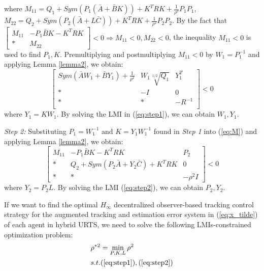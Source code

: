 \documentclass[journal,12pt,onecolumn,draftclsnofoot,]{IEEEtran}
\begin{document}
where $M_{11}=Q_1+Sym(P_1(\bar{A}+\bar{B}K)) + K^TRK + \frac{1}{\rho^2}P_1P_1$, $M_{22}=Q_2+Sym(P_2(\bar{A}+L\bar{C})) + K^TRK + \frac{1}{\rho^2}P_2P_2$. By the fact that $\begin{bmatrix}
    M_{11} & -P_1\bar{B}K - K^TRK \\ * & M_{22}
\end{bmatrix} < 0 \Rightarrow M_{11}<0, M_{22}<0$, the inequality $M_{11}<0$ is used to find $P_1,K$. Premultiplying and
postmultiplying $M_{11}<0$ by $W_1=P_1^{-1}$ and applying Lemma \ref{lemma2}, we obtain:
\begin{equation} \label{eq:step1}
    \begin{bmatrix}
        Sym(\bar{A}W_1+\bar{B}Y_1) + \frac{1}{\rho^2} & W_1\sqrt[1/2]{Q_1} & Y_1^T \\
        * & -I & 0\\
        * & * & -R^{-1}\\
    \end{bmatrix} < 0
\end{equation}
where $Y_1=KW_1$. By solving the LMI in (\ref{eq:step1}), we can obtain $W_1,Y_1$.

\textit{Step 2:} Substituting $P_1=W_1^{-1}$ and $K=Y_1W_1^{-1}$ found in \textit{Step 1} into (\ref{eq:M}) and applying Lemma \ref{lemma2}, we obtain:
\begin{equation} \label{eq:step2}
    \begin{bmatrix}
        M_{11} & -P_1\bar{B}K - K^TRK & P_2 \\
        * & Q_2+Sym(P_2\bar{A}+Y_2\bar{C}) + K^TRK & 0 \\
        * & * & -\rho^2I
    \end{bmatrix} < 0
\end{equation}
where $Y_2=P_2L$. By solving the LMI (\ref{eq:step2}), we can obtain $P_2,Y_2$.


If we want to find the optimal $H_\infty$ decentralized observer-based tracking control strategy for the augmented tracking and estimation error system in (\ref{eq:x_tilde}) of each agent in hybrid URTS, we need to solve the following LMIs-constrained optimization problem:
\begin{equation} \label{LMI constraint}
    \begin{split}
        & \rho^{*2}=\mathop{\min}_{P,K,L} \rho^2 \\
        & s.t. (\refeq{eq:step1}),(\refeq{eq:step2}) 
    \end{split}
\end{equation}
\end{document}
